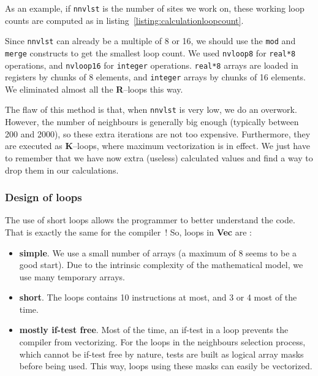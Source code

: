 \documentclass[9pt,comparison]{livecoms}
\newcommand{\lv}{\Large\verb}
\begin{document}
As an example, if {\color{blue}\lv|nnvlst|} is the number of sites we work on, these working loop counts are computed as in listing~\ref{listing:calculationloopcount}.


Since {\color{blue}\lv|nnvlst|} can already be a multiple of 8 or 16, we should use the {\color{blue}\lv|mod|} and {\color{blue}\lv|merge|} constructs to get the smallest loop count. We used {\color{blue}\lv|nvloop8|} for {\color{codegreen}\lv|real*8|} operations, and {\color{blue}\lv|nvloop16|} for {\color{codegreen}\lv|integer|} operations. {\color{codegreen}\lv|real*8|} arrays are loaded in registers by chunks of 8 elements, and {\color{codegreen}\lv|integer|} arrays by chunks of 16 elements. We eliminated almost all the \textbf{R}--loops this way.

The flaw of this method is that, when {\color{blue}\lv|nnvlst|} is very low, we do an overwork. However, the number of neighbours is generally big enough (typically between 200 and 2000), so these extra iterations are not too expensive. Furthermore, they are executed as \textbf{K}--loops, where maximum vectorization is in effect. We just have to remember that we have now extra (useless) calculated values and find a way to drop them in our calculations.

\subsubsection{Design of loops}
\hspace{\parindent}The use of short loops allows the programmer to better understand the code. That is exactly the same for the compiler~! So, loops in \textbf{Vec} are :
\begin{itemize}
    \item \textbf{simple}. We use a small number of arrays (a maximum of 8 seems to be a good start). Due to the intrinsic complexity of the mathematical model, we use many temporary arrays.
    \item \textbf{short}. The loops contains 10 instructions at most, and 3 or 4 most of the time. 
    \item \textbf{mostly if-test free}. Most of the time, an  if-test in a loop prevents the compiler from vectorizing. For the loops in the neighbours selection process, which cannot be if-test free by nature, tests are built as logical array masks before being used. This way, loops using these masks can easily be vectorized.
\end{itemize}
\end{document}

